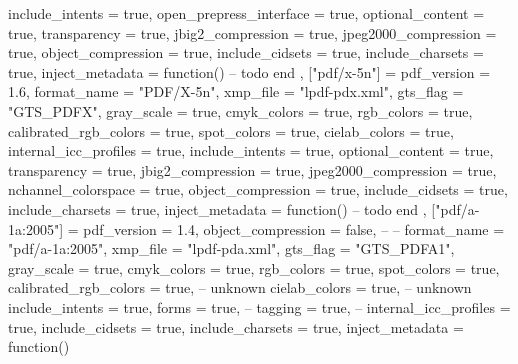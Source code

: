 {{            include_intents         = true,
            open_prepress_interface = true,
            optional_content        = true,
            transparency            = true,
            jbig2_compression       = true,
            jpeg2000_compression    = true,
            object_compression      = true,
            include_cidsets         = true,
            include_charsets        = true,
            inject_metadata         = function()
                -- todo
            end
        },
        ["pdf/x-5n"] = {
            pdf_version             = 1.6,
            format_name             = "PDF/X-5n",
            xmp_file                = "lpdf-pdx.xml",
            gts_flag                = "GTS_PDFX",
            gray_scale              = true,
            cmyk_colors             = true,
            rgb_colors              = true,
            calibrated_rgb_colors   = true,
            spot_colors             = true,
            cielab_colors           = true,
            internal_icc_profiles   = true,
            include_intents         = true,
            optional_content        = true,
            transparency            = true,
            jbig2_compression       = true,
            jpeg2000_compression    = true,
            nchannel_colorspace     = true,
            object_compression      = true,
            include_cidsets         = true,
            include_charsets        = true,
            inject_metadata         = function()
                -- todo
            end
        },
        ["pdf/a-1a:2005"] = {
            pdf_version             = 1.4,
            object_compression      = false, -- %
                                             -- %
            format_name             = "pdf/a-1a:2005",
            xmp_file                = "lpdf-pda.xml",
            gts_flag                = "GTS_PDFA1",
            gray_scale              = true,
            cmyk_colors             = true,
            rgb_colors              = true,
            spot_colors             = true,
            calibrated_rgb_colors   = true, -- unknown
            cielab_colors           = true, -- unknown
            include_intents         = true,
            forms                   = true, -- %
            tagging                 = true, -- %
            internal_icc_profiles   = true,
            include_cidsets         = true,
            include_charsets        = true,
            inject_metadata         = function()
}}
